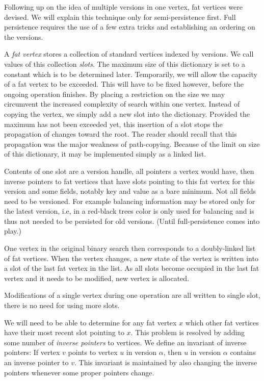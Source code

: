 Following up on the idea of multiple versions in one vertex, fat vertices were devised. 
We will explain this technique only for semi-persistence first. 
Full persistence requires the use of a few extra tricks and establishing an ordering on the versions.

A \emph{fat vertex} stores a collection of standard vertices indexed by versions. 
We call values of this collection \emph{slots}. 
The maximum size of this dictionary is set to a constant which is to be determined later. 
Temporarily, we will allow the capacity of a fat vertex to be exceeded. 
This will have to be fixed however, before the ongoing operation finishes.
By placing a restriction on the size we may circumvent the increased complexity of search within one vertex.
Instead of copying the vertex, we simply add a new slot into the dictionary. 
Provided the maximum has not been exceeded yet, this insertion of a slot stops the propagation of changes toward the root. 
The reader should recall that this propagation was the major weakness of path-copying.
Because of the limit on size of this dictionary, it may be implemented simply as a linked list.

Contents of one slot are a version handle, all pointers a vertex would have, then inverse pointers to fat vertices that have slots pointing to this fat vertex for this version and some fields, notably key and value as a bare minimum.
Not all fields need to be versioned. 
For example balancing information may be stored only for the latest version, i.e, in a red-black trees color is only used for balancing and is thus not needed to be persisted for old versions. 
(Until full-persistence comes into play.)

One vertex in the original binary search then corresponds to a doubly-linked list of fat vertices.
When the vertex changes, a new state of the vertex is written into a slot of the last fat vertex in the list. 
As all slots become occupied in the last fat vertex and it needs to be modified, new vertex is allocated.

Modifications of a single vertex during one operation are all written to single slot, there is no need for using more slots.

We will need to be able to determine for any fat vertex $x$ which other fat vertices have their most recent slot pointing to $x$. 
This problem is resolved by adding some number of \emph{inverse pointers} to vertices. 
We define an invariant of inverse pointers: If vertex $v$ points to vertex $u$ in version $\alpha$, then $u$ in version $\alpha$ contains an inverse pointer to $v$. This invariant is maintained by also changing the inverse pointers whenever some proper pointers change. 

